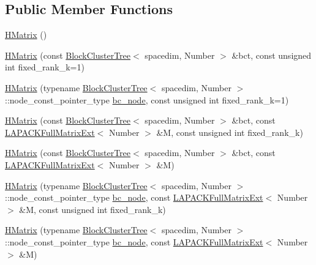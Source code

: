 \subsection*{Public Member Functions}
\begin{DoxyCompactItemize}
\item 
\hyperlink{classHMatrix_ae3dc35e1aefee2580d27ad2d65c906de}{H\+Matrix} ()
\item 
\hyperlink{classHMatrix_a6a4dead0321e8df38865bf6fbd0f6e81}{H\+Matrix} (const \hyperlink{classBlockClusterTree}{Block\+Cluster\+Tree}$<$ spacedim, Number $>$ \&bct, const unsigned int fixed\+\_\+rank\+\_\+k=1)
\item 
\hyperlink{classHMatrix_a4fe44a3aa2b813f593b787f24be56a1c}{H\+Matrix} (typename \hyperlink{classBlockClusterTree}{Block\+Cluster\+Tree}$<$ spacedim, Number $>$\+::node\+\_\+const\+\_\+pointer\+\_\+type \hyperlink{classHMatrix_a4a304494c970b5b267be1d8459d51586}{bc\+\_\+node}, const unsigned int fixed\+\_\+rank\+\_\+k=1)
\item 
\hyperlink{classHMatrix_ad3a62fe726b69cbde07b1f434417d318}{H\+Matrix} (const \hyperlink{classBlockClusterTree}{Block\+Cluster\+Tree}$<$ spacedim, Number $>$ \&bct, const \hyperlink{classLAPACKFullMatrixExt}{L\+A\+P\+A\+C\+K\+Full\+Matrix\+Ext}$<$ Number $>$ \&M, const unsigned int fixed\+\_\+rank\+\_\+k)
\item 
\hyperlink{classHMatrix_af72a32400b866e633dda058c949d4f79}{H\+Matrix} (const \hyperlink{classBlockClusterTree}{Block\+Cluster\+Tree}$<$ spacedim, Number $>$ \&bct, const \hyperlink{classLAPACKFullMatrixExt}{L\+A\+P\+A\+C\+K\+Full\+Matrix\+Ext}$<$ Number $>$ \&M)
\item 
\hyperlink{classHMatrix_a3d444d5d8d3d88e31b7c1046c29017fd}{H\+Matrix} (typename \hyperlink{classBlockClusterTree}{Block\+Cluster\+Tree}$<$ spacedim, Number $>$\+::node\+\_\+const\+\_\+pointer\+\_\+type \hyperlink{classHMatrix_a4a304494c970b5b267be1d8459d51586}{bc\+\_\+node}, const \hyperlink{classLAPACKFullMatrixExt}{L\+A\+P\+A\+C\+K\+Full\+Matrix\+Ext}$<$ Number $>$ \&M, const unsigned int fixed\+\_\+rank\+\_\+k)
\item 
\hyperlink{classHMatrix_a97b27ea3c54897b34ccb163415d1569d}{H\+Matrix} (typename \hyperlink{classBlockClusterTree}{Block\+Cluster\+Tree}$<$ spacedim, Number $>$\+::node\+\_\+const\+\_\+pointer\+\_\+type \hyperlink{classHMatrix_a4a304494c970b5b267be1d8459d51586}{bc\+\_\+node}, const \hyperlink{classLAPACKFullMatrixExt}{L\+A\+P\+A\+C\+K\+Full\+Matrix\+Ext}$<$ Number $>$ \&M)
\item 

\end{DoxyCompactItemize}
